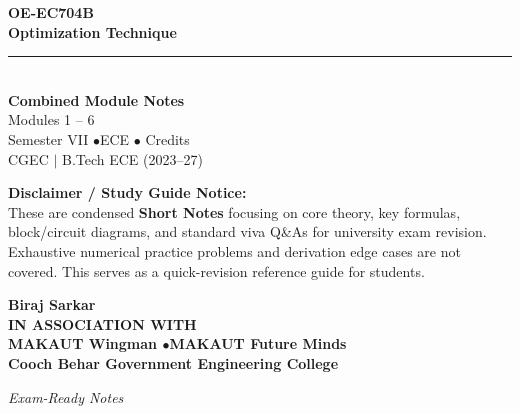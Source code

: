 \documentclass[12pt,a4paper]{article}
\begin{document}
\thispagestyle{empty}


\vspace*{1.0cm}
\begin{center}
  {\Huge\bfseries\color{myred} OE-EC704B}\\[10pt]
  {\LARGE\bfseries\color{mydark} Optimization Technique}\\[20pt]
  {\color{myred}\rule{0.7\linewidth}{1.5pt}}\\[18pt]
  {\Large\color{myteal}\textbf{Combined Module Notes}}\\[8pt]
  {\large\color{mydark} Modules 1 -- 6}\\[40pt]
  {\normalsize\color{mydark} Semester VII \quad$\bullet$\quad ECE \quad$\bullet$ Credits}\\[12pt]
  {\normalsize\color{mydark} CGEC \;$|$\; B.Tech ECE (2023--27)}
\end{center}
\vspace{1.0cm}
\begin{center}
  \begin{tcolorbox}[colback=mygray, colframe=mgframe, boxrule=0.5pt, arc=3pt, width=0.85\linewidth]
    \centering\small\color{mydark}
    \textbf{Disclaimer / Study Guide Notice:}\\
    These are condensed \textbf{Short Notes} focusing on core theory, key formulas, block/circuit diagrams, and standard viva Q\&As for university exam revision. Exhaustive numerical practice problems and derivation edge cases are not covered. This serves as a quick-revision reference guide for students.
  \end{tcolorbox}
\end{center}
\vfill
\vspace{0.6cm}
\begin{center}
  {\large\bfseries\color{mypurple} Biraj Sarkar}\\[16pt]
  {\footnotesize\color{watermark}\textbf{IN ASSOCIATION WITH}}\\[8pt]
  {\small\bfseries\color{mydark} MAKAUT Wingman \quad$\bullet$\quad MAKAUT Future Minds}\\[12pt]
  {\large\bfseries\color{myteal} Cooch Behar Government Engineering College}
\end{center}
\vfill
\begin{center}{\small\color{watermark}\textit{Exam-Ready Notes}}\end{center}
\clearpage
\end{document}
